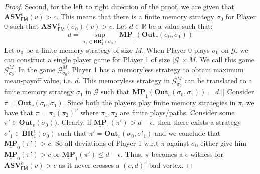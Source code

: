 \begin{proof}
	Second, for the left to right direction of the proof, we are given that $\mathbf{ASV}_{\mathsf{FM}}^{\epsilon}(v) > c$. This means that there is a finite memory strategy $\sigma_0$ for Player 0 such that $\mathbf{ASV}_{\mathsf{FM}}^{\epsilon}(\sigma_0)(v) > c$. Let $d \in \mathbb{R}$ be a value such that:
	\begin{equation*}
	    d = \sup\limits_{\sigma_1 \in \mathbf{BR}_1^{\epsilon}(\sigma_0)} \underline{\mathbf{MP}}_1(\mathbf{Out}_v(\sigma_0, \sigma_1))
	\end{equation*}
	Let $\sigma_0$ be a finite memory strategy of size $M$. When Player 0 plays $\sigma_0$ on $\mathcal{G}$, we can construct a single player game for Player 1 of size $|\mathcal{G}|\times M$. We call this game $\mathcal{G}^M_{\sigma_0}$. In the game $\mathcal{G}^M_{\sigma_0}$, Player 1 has a memoryless strategy to obtain maximum mean-payoff value, i.e. $d$. This memoryless strategy in $\mathcal{G}^M_{\sigma_0}$ can be translated to a finite memory strategy $\sigma_1$ in $\mathcal{G}$ such that $\underline{\mathbf{MP}}_1(\mathbf{Out}_v(\sigma_0, \sigma_1)) = d$.[]
	Consider $\pi = \mathbf{Out}_v(\sigma_0, \sigma_1)$. Since both the players play finite memory strategies in $\pi$, we have that $\pi = \pi_1(\pi_2)^{\omega}$ where $\pi_1, \pi_2$ are finite plays/paths. Consider some $\pi' \in \mathbf{Out}_v(\sigma_0))$. Clearly, if $\underline{\mathbf{MP}}_1(\pi') > d-\epsilon$, then there exists a strategy $\sigma'_1 \in \mathbf{BR}_1^{\epsilon}(\sigma_0)$ such that $\pi' = \mathbf{Out}_v(\sigma_0, \sigma'_1)$ and we conclude that $\underline{\mathbf{MP}}_0(\pi') > c$. So all deviations of Player 1 w.r.t $\pi$ against $\sigma_0$ either give him $\underline{\mathbf{MP}}_0(\pi') > c$ or $\underline{\mathbf{MP}}_1(\pi') \leqslant d-\epsilon$. Thus, $\pi$ becomes a $\epsilon$-witness for $\mathbf{ASV}_{\mathsf{FM}}^{\epsilon}(v) > c$ as it never crosses a $(c,d)^{\epsilon}$-bad vertex.
\end{proof}